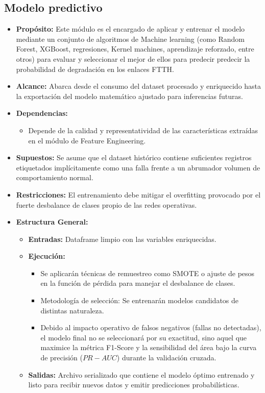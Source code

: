 \documentclass[12pt,a4paper]{article}
\begin{document}
    \subsection{Modelo predictivo}
    \begin{itemize}
        \item \textbf{Propósito:} Este módulo es el encargado de aplicar y entrenar el modelo mediante un conjunto de algoritmos de Machine learning (como Random Forest, XGBoost, regresiones, Kernel machines, aprendizaje reforzado, entre otros) para evaluar y seleccionar el mejor de ellos para predecir
        predecir la probabilidad de degradación en los enlaces FTTH.

        \item \textbf{Alcance:} Abarca desde el consumo del dataset procesado y enriquecido hasta la exportación del modelo matemático ajustado para inferencias futuras.
        \item \textbf{Dependencias:}
        \begin{itemize}
            \item Depende de la calidad y representatividad de las características extraídas en el módulo de Feature Engineering.
        \end{itemize}
        \item \textbf{Supuestos:} Se asume que el dataset histórico contiene suficientes registros etiquetados implícitamente como una falla frente a un abrumador volumen de comportamiento normal.
        \item \textbf{Restricciones:} El entrenamiento debe mitigar el overfitting provocado por el fuerte desbalance de clases propio de las redes operativas.
        \item \textbf{Estructura General:}
        \begin{itemize}
            \item \textbf{Entradas:} Dataframe limpio con las variables enriquecidas.
            \item \textbf{Ejecución:}
            \begin{itemize}
                \item Se aplicarán técnicas de remuestreo como SMOTE o ajuste de pesos en la función de pérdida para manejar el desbalance de clases.
                \item Metodología de selección: Se entrenarán modelos candidatos de distintas naturaleza.
                \item Debido al impacto operativo de falsos negativos (fallas no detectadas), el modelo final no se seleccionará por su exactitud, sino aquel que maximice la métrica 
                F1-Score y la sensibilidad del área bajo la curva de precisión ($PR-AUC$) durante la validación cruzada.
            \end{itemize}
            \item \textbf{Salidas:} Archivo serializado que contiene el modelo óptimo entrenado y listo para recibir nuevos datos y emitir predicciones probabilísticas.
        \end{itemize}
    \end{itemize}
\end{document}
